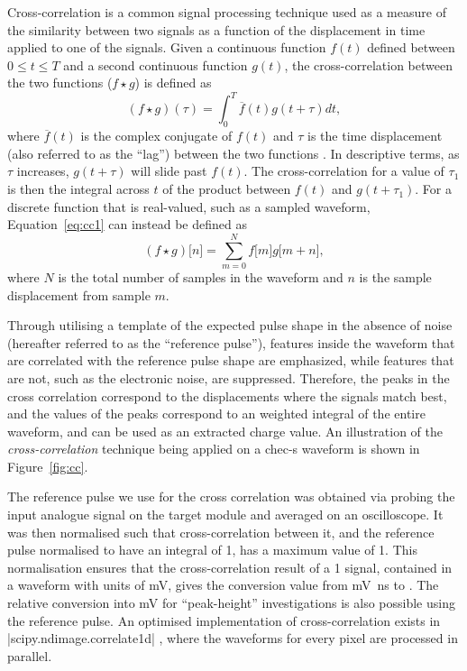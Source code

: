 Cross-correlation is a common signal processing technique used as a measure of the similarity between two signals as a function of the displacement in time applied to one of the signals. Given a continuous function $f(t)$ defined between $0 \le t \le T$ and a second continuous function $g(t)$, the cross-correlation between the two functions ($f \star g$) is defined as 
\begin{equation} \label{eq:cc1}
(f \star g)(\tau) = \int_0^T \overline{f}(t)g(t + \tau)dt,
\end{equation}
where $\overline{f}(t)$ is the complex conjugate of $f(t)$ and $\tau$ is the time displacement (also referred to as the ``lag'') between the two functions \cite{wolfram-crosscorrelate}. In descriptive terms, as $\tau$ increases, $g(t + \tau)$ will slide past $f(t)$. The cross-correlation for a value of $\tau_1$ is then the integral across $t$ of the product between $f(t)$ and $g(t + \tau_1)$. For a discrete function that is real-valued, such as a sampled waveform, Equation~\ref{eq:cc1} can instead be defined as
\begin{equation} \label{eq:cc2}
(f \star g)\lbrack n \rbrack = \sum_{m=0}^N f\lbrack m \rbrack g\lbrack m + n\rbrack,
\end{equation}
where $N$ is the total number of samples in the waveform and $n$ is the sample displacement from sample $m$. 

Through utilising a template of the expected pulse shape in the absence of noise (hereafter referred to as the ``reference pulse''), features inside the waveform that are correlated with the reference pulse shape are emphasized, while features that are not, such as the electronic noise, are suppressed. Therefore, the peaks in the cross correlation correspond to the displacements where the signals match best, and the values of the peaks correspond to an weighted integral of the entire waveform, and can be used as an extracted charge value. An illustration of the \textit{cross-correlation} technique being applied on a \gls{chec-s} waveform is shown in Figure~\ref{fig:cc}. 

The reference pulse we use for the cross correlation was obtained via probing the input analogue signal on the \gls{target} module and averaged on an oscilloscope. It was then normalised such that cross-correlation between it, and the reference pulse normalised to have an integral of 1, has a maximum value of 1. This normalisation ensures that the cross-correlation result of a \SI{1}{\pe} signal, contained in a waveform with units of \si{mV}, gives the conversion value from \si{mV ns} to \si{\pe}. The relative conversion into \si{mV} for ``peak-height'' investigations is also possible using the reference pulse. An optimised implementation of cross-correlation exists in |scipy.ndimage.correlate1d| \cite{scipy-crosscorrelate}, where the waveforms for every pixel are processed in parallel.

